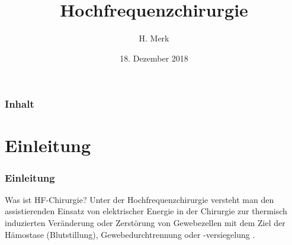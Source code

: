 \documentclass{beamer}
\begin{document}
\title[HF-Chirurgie]{Hochfrequenzchirurgie}
\author{H. Merk}
\date{18. Dezember 2018}

\begin{frame}
\maketitle
\end{frame}


\begin{frame}
\frametitle{Inhalt}
\tableofcontents
\end{frame}



\section{Einleitung}
\begin{frame}
\frametitle{Einleitung}
	\begin{block}{Was ist HF-Chirurgie?}
		Unter der Hochfrequenzchirurgie versteht man den assistierenden Einsatz von elektrischer Energie in der Chirurgie zur thermisch induzierten Veränderung oder Zerstörung von Gewebezellen mit dem Ziel der Hämostase (Blutstillung), Gewebedurchtrennung oder -versiegelung \cite{kramme2016medizintechnik}.
	\end{block}
	\begin{minipage}[t]{0.49\textwidth}
	\end{minipage}
	\begin{minipage}[t]{0.49\textwidth}
	\end{minipage}
\end{frame}
\end{document}
